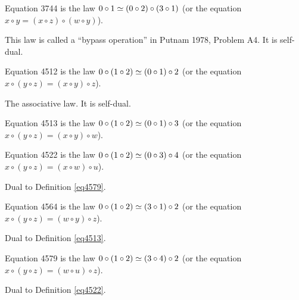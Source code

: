 \begin{definition}[Equation 3744]\label{eq3744}\leanok{}  Equation 3744 is the law $0 \circ 1  \simeq  (0 \circ 2) \circ (3 \circ 1)$ (or the equation $x \circ y = (x \circ z) \circ (w \circ y)$).
\end{definition}

This law is called a ``bypass operation'' in Putnam 1978, Problem A4. It is self-dual.

\begin{definition}[Equation 4512]\label{eq4512}\leanok{}  Equation 4512 is the law $0 \circ (1 \circ 2)  \simeq  (0 \circ 1) \circ 2$ (or the equation $x \circ (y \circ z) = (x \circ y) \circ z$).
\end{definition}

The associative law. It is self-dual.

\begin{definition}[Equation 4513]\label{eq4513}\leanok{}  Equation 4513 is the law $0 \circ (1 \circ 2)  \simeq  (0 \circ 1) \circ 3$ (or the equation $x \circ (y \circ z) = (x \circ y) \circ w$).
\end{definition}

\begin{definition}[Equation 4522]\label{eq4522}\leanok{}  Equation 4522 is the law $0 \circ (1 \circ 2)  \simeq  (0 \circ 3) \circ 4$ (or the equation $x \circ (y \circ z) = (x \circ w) \circ u$).
\end{definition}

Dual to Definition \ref{eq4579}.

\begin{definition}[Equation 4564]\label{eq4564}\leanok{}  Equation 4564 is the law $0 \circ (1 \circ 2)  \simeq  (3 \circ 1) \circ 2$ (or the equation $x \circ (y \circ z) = (w \circ y) \circ z$).
\end{definition}

Dual to Definition \ref{eq4513}.

\begin{definition}[Equation 4579]\label{eq4579}\leanok{}  Equation 4579 is the law $0 \circ (1 \circ 2)  \simeq  (3 \circ 4) \circ 2$ (or the equation $x \circ (y \circ z) = (w \circ u) \circ z$).
\end{definition}

Dual to Definition \ref{eq4522}.

